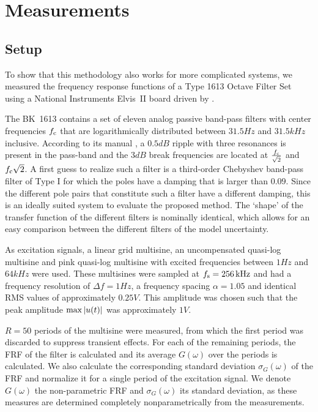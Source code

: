 \section{Measurements} \label{sec:measurement}
  \subsection{Setup}
    To show that this methodology also works for more complicated systems, we measured the frequency response functions of a \bruelkjaer Type 1613 Octave Filter Set using a National Instruments Elvis~II board driven by \labview.
    
    The BK~1613 contains a set of eleven analog passive band-pass filters with center frequencies $f_{\mathrm{c}}$ that are logarithmically distributed between $31.5\unit{Hz}$ and $31.5\unit{kHz}$ inclusive.
    According to its manual \citep{datasheet_bk1613}, a $0.5\unit{dB}$ ripple with three resonances is present in the pass-band and the $3\unit{dB}$ break frequencies are located at $\frac{f_{\mathrm{c}}}{\sqrt{2}}$ and $f_{\mathrm{c}} \sqrt{2}$.
    A first guess to realize such a filter is a third-order Chebyshev band-pass filter of Type I \citep{Zverev1967} for which the poles have a damping that is larger than $0.09$.
    Since the different pole pairs that constitute such a filter have a different damping, this is an ideally suited system to evaluate the proposed method.
    The `shape' of the transfer function of the different filters is nominally identical, which allows for an easy comparison between the different filters of the model uncertainty.

    As excitation signals, a linear grid multisine, an uncompensated quasi-log multisine and pink quasi-log multisine with excited frequencies between $1 \unit{Hz}$ and $64 \unit{kHz}$ were used.
    These multisines were sampled at $f_{\mathrm{s}} = 256\,\mathrm{kHz}$ and had a frequency resolution of $\Delta f = 1 \unit{Hz}$, a frequency spacing $\alpha = 1.05$ and identical RMS values of approximately $0.25 \unit{V}$.
    This amplitude was chosen such that the peak amplitude $\max \left| u(t) \right|$ was approximately $1 \unit{V}$.

    $R=50$ periods of the multisine were measured, from which the first period was discarded to suppress transient effects.
    For each of the remaining periods, the FRF of the filter is calculated and its average $G\left(\omega \right)$ over the periods is calculated.
    We also calculate the corresponding standard deviation $\sigma_G\left( \omega \right)$ of the FRF and normalize it for a single period of the excitation signal.
    We denote $G\left(\omega \right)$ the non-parametric FRF and $\sigma_G\left( \omega \right)$ its standard deviation, as these measures are determined completely nonparametrically from the measurements.

